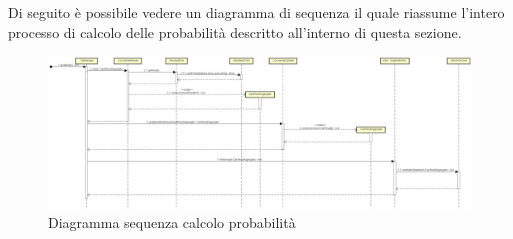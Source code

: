 Di seguito è possibile vedere un diagramma di sequenza il quale riassume l'intero processo di calcolo delle probabilità descritto all'interno di questa sezione.
\begin{figure} [H]
	\centering
			\includegraphics[scale=0.165]{Img/ProcessoRicalcolo}
	\caption{Diagramma sequenza calcolo probabilità}\label{}
\end{figure}

